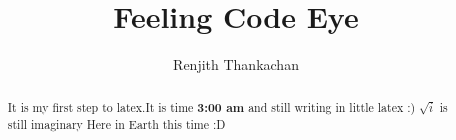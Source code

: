 \documentclass[]{article}
\begin{document}
\title{Feeling Code Eye}
\author{Renjith Thankachan}
\maketitle

\begin{abstract}
It is my first step to latex.It is time \textbf{3:00 am} and still writing in little latex :)
$\sqrt{i}$ is still imaginary Here in Earth this time :D
\end{abstract}
\end{document}
